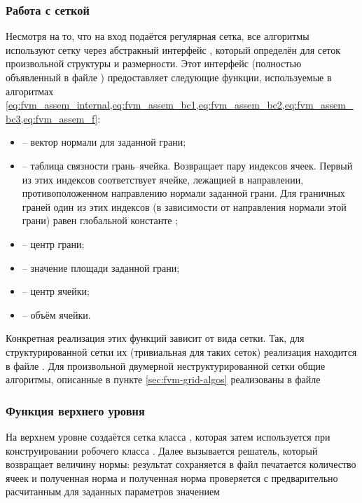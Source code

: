 \subsubsection{Работа с сеткой}
Несмотря на то, что на вход
подаётся регулярная сетка,
все алгоритмы используют сетку
через абстракный интерфейс ,
который определён для
сеток произвольной структуры и размерности.
Этот интерфейс (полностью объявленный в файле ) предоставляет следующие функции, используемые в алгоритмах
\cref{eq:fvm_assem_internal,eq:fvm_assem_bc1,eq:fvm_assem_bc2,eq:fvm_assem_bc3,eq:fvm_assem_f}:
\begin{itemize}
\item
{} -- вектор нормали для заданной грани;
\item
{} -- таблица связности грань--ячейка. Возвращает
пару индексов ячеек. Первый из этих индексов соответствует ячейке,
лежащией в направлении, противоположенном направлению нормали заданной грани.
Для граничных граней один из этих индексов (в зависимости от направления нормали этой грани)
равен глобальной константе ;
\item
{} -- центр грани;
\item
{} -- значение площади заданной грани;
\item
{} -- центр ячейки;
\item
{} -- объём ячейки.
\end{itemize}
Конкретная реализация этих функций зависит от вида сетки.
Так, для структурированной сетки  
их (тривиальная для таких сеток) реализация 
находится в файле .
Для произвольной двумерной неструктурированной сетки
общие алгоритмы, описанные в пункте \ref{sec:fvm-grid-algos}
реализованы в файле

\subsubsection{Функция верхнего уровня}
На верхнем уровне создаётся сетка класса ,
которая затем используется при конструировании
робочего класса .
Далее вызывается решатель, который возвращает величину нормы:
результат сохраняется в файл
печатается количество ячеек и полученная норма
и полученная норма проверяется с предварительно расчитанным
для заданных параметров значением

